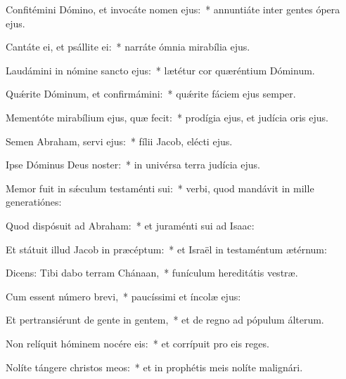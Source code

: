 \item Confitémini Dómino, et invocáte nomen ejus:~* annuntiáte inter gentes ópera ejus.

\item Cantáte ei, et psállite ei:~* narráte ómnia mirabília ejus.

\item Laudámini in nómine sancto ejus:~* lætétur cor quæréntium Dóminum.

\item Quǽrite Dóminum, et confirmámini:~* quǽrite fáciem ejus semper.

\item Mementóte mirabílium ejus, quæ fecit:~* prodígia ejus, et judícia oris ejus.

\item Semen Abraham, servi ejus:~* fílii Jacob, elécti ejus.

\item Ipse Dóminus Deus noster:~* in univérsa terra judícia ejus.

\item Memor fuit in sǽculum testaménti sui:~* verbi, quod mandávit in mille generatiónes:

\item Quod dispósuit ad Abraham:~* et juraménti sui ad Isaac:

\item Et státuit illud Jacob in præcéptum:~* et Israël in testaméntum ætérnum:

\item Dicens: Tibi dabo terram Chánaan,~* funículum hereditátis vestræ.

\item Cum essent número brevi,~* paucíssimi et íncolæ ejus:

\item Et pertransiérunt de gente in gentem,~* et de regno ad pópulum álterum.

\item Non relíquit hóminem nocére eis:~* et corrípuit pro eis reges.

\item Nolíte tángere christos meos:~* et in prophétis meis nolíte malignári.
